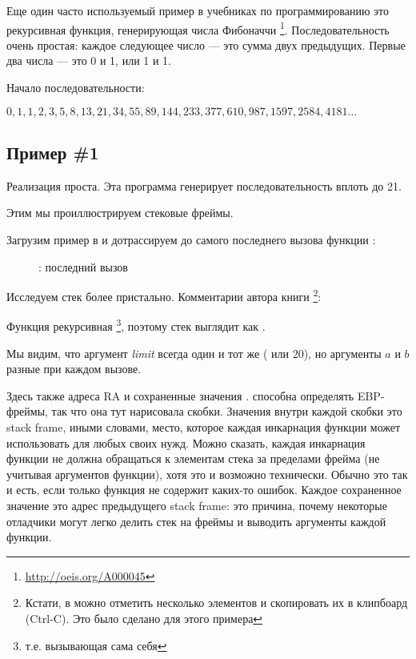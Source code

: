 
Еще один часто используемый пример в учебниках по программированию это рекурсивная функция,
генерирующая числа Фибоначчи
\footnote{\url{http://oeis.org/A000045}}.
Последовательность очень простая: каждое следующее число --- это сумма двух предыдущих.
Первые два числа --- это 0 и 1, или 1 и 1.

Начало последовательности:

\begin{center}
$0, 1, 1, 2, 3, 5, 8, 13, 21, 34, 55, 89, 144, 233, 377, 610, 987, 1597, 2584, 4181 ...$
\end{center}

\subsection{Пример \#1}

Реализация проста. Эта программа генерирует последовательность вплоть до 21.





Этим мы проиллюстрируем стековые фреймы.

\clearpage
Загрузим пример в \olly и дотрассируем до самого последнего вызова функции \ttf{}:

\begin{figure}[H]
\centering
{}
\caption{\olly: последний вызов \ttf{}}
\label{fig:fib_olly}
\end{figure}

\clearpage
Исследуем стек более пристально. 
Комментарии автора книги
\footnote{Кстати, в \olly можно отметить несколько элементов и скопировать их в клипбоард (Ctrl-C).
Это было сделано для этого примера}:



Функция рекурсивная
\footnote{т.е. вызывающая сама себя}, 
поэтому стек выглядит как .

Мы видим, что аргумент \emph{limit} всегда один и тот же ( или 20), но аргументы $a$ и $b$ разные при каждом вызове.

Здесь также адреса \ac{RA} и сохраненные значения \EBP.
\olly способна определять EBP-фреймы, так что она тут нарисовала скобки.
Значения внутри каждой скобки это \gls{stack frame}, иными словами, место, которое каждая
инкарнация функции может использовать для любых своих нужд. 
Можно сказать, каждая инкарнация функции не должна обращаться к элементам стека за пределами
фрейма (не учитывая аргументов функции), хотя это и возможно технически. 
Обычно это так и есть, если только функция не содержит каких-то ошибок.
Каждое сохраненное значение \EBP это адрес предыдущего \gls{stack frame}:
это причина, почему некоторые отладчики могут легко делить стек на фреймы и выводить
аргументы каждой функции.

